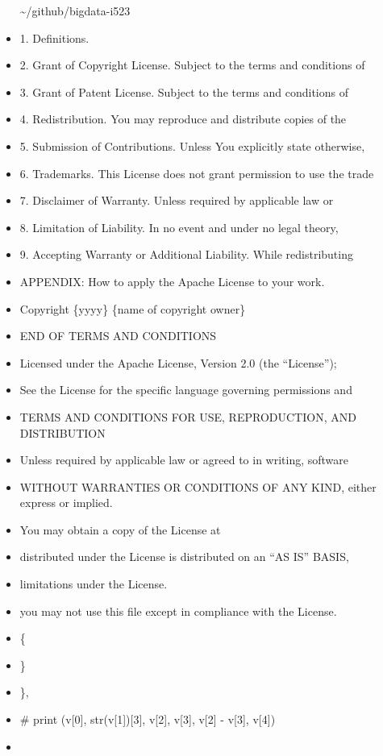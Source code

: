 \begin{itemize}
  \textasciitilde{}/github/bigdata-i523
\item
  1. Definitions.
\item
  2. Grant of Copyright License. Subject to the terms and conditions of
\item
  3. Grant of Patent License. Subject to the terms and conditions of
\item
  4. Redistribution. You may reproduce and distribute copies of the
\item
  5. Submission of Contributions. Unless You explicitly state otherwise,
\item
  6. Trademarks. This License does not grant permission to use the trade
\item
  7. Disclaimer of Warranty. Unless required by applicable law or
\item
  8. Limitation of Liability. In no event and under no legal theory,
\item
  9. Accepting Warranty or Additional Liability. While redistributing
\item
  APPENDIX: How to apply the Apache License to your work.
\item
  Copyright \{yyyy\} \{name of copyright owner\}
\item
  END OF TERMS AND CONDITIONS
\item
  Licensed under the Apache License, Version 2.0 (the ``License'');
\item
  See the License for the specific language governing permissions and
\item
  TERMS AND CONDITIONS FOR USE, REPRODUCTION, AND DISTRIBUTION
\item
  Unless required by applicable law or agreed to in writing, software
\item
  WITHOUT WARRANTIES OR CONDITIONS OF ANY KIND, either express or
  implied.
\item
  You may obtain a copy of the License at
\item
  distributed under the License is distributed on an ``AS IS'' BASIS,
\item
  limitations under the License.
\item
  you may not use this file except in compliance with the License.
\item
  \{
\item
  \}
\item
  \},
\item
  \# print (v{[}0{]}, str(v{[}1{]}){[}3{]}, v{[}2{]}, v{[}3{]}, v{[}2{]}
  - v{[}3{]}, v{[}4{]})
\item

\end{itemize}
